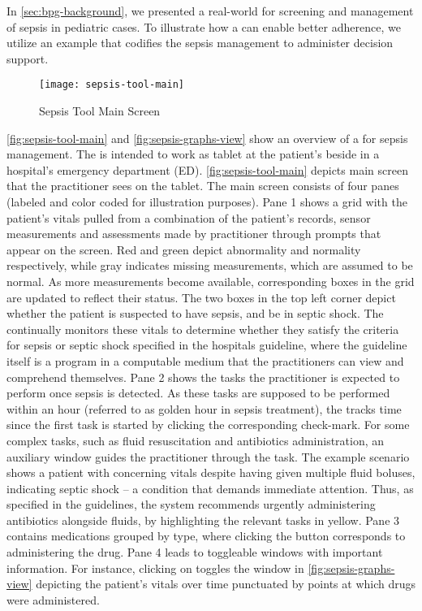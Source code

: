 In \autoref{sec:bpg-background}, we presented a real-world
\BPG{} for screening and management of sepsis in pediatric cases.
To illustrate how a \CDSSs{} can enable better \BPG{} adherence,
we utilize an example \CDSS{} that codifies the sepsis management \BPG{}
to administer decision support.

\begin{figure}[t!]
  \centering
  \texttt{[image: sepsis-tool-main]}
  \caption{Sepsis Tool Main Screen}\label{fig:sepsis-tool-main}
\end{figure}

\autoref{fig:sepsis-tool-main} and \autoref{fig:sepsis-graphs-view} show an overview
of a \CDSS{} for sepsis management.
The \CDSS{} is intended to work as tablet at
the patient's beside in a hospital's emergency department (ED).
\autoref{fig:sepsis-tool-main} depicts main screen that the practitioner sees on the tablet.
The main screen consists of four panes (labeled and color coded for illustration
purposes). Pane 1 shows a grid with the patient's vitals pulled
from a combination of the patient's records, sensor measurements and
assessments made by practitioner through prompts that appear on the screen.
Red and green depict abnormality and normality respectively, while gray
indicates missing measurements, which are assumed to be normal. As more
measurements become available, corresponding boxes in the grid are updated
to reflect their status. The two boxes in the top left corner depict whether
the patient is suspected to have sepsis, and be in septic shock. The \CDSS{}
continually monitors these vitals to determine whether they satisfy the criteria
for sepsis or septic shock specified in the hospitals guideline, where the
guideline itself is a program in a computable medium that the practitioners
can view and comprehend themselves. Pane 2 shows the tasks the practitioner is expected to perform
once sepsis is detected. As these tasks are supposed to be performed within an
hour (referred to as golden hour in sepsis treatment), the \CDSS{} tracks time
since the first task is started by clicking the corresponding check-mark.
For some complex tasks, such as fluid resuscitation and antibiotics
administration, an auxiliary window guides the practitioner through the task. The
example scenario shows a patient with concerning vitals despite having
given multiple fluid boluses, indicating septic shock -- a condition that
demands immediate attention. Thus, as specified in the guidelines, the system
recommends urgently administering antibiotics alongside fluids, by highlighting
the relevant tasks in yellow.
Pane 3 contains medications grouped by type, where clicking the
 button corresponds to administering the drug.
Pane 4 leads to toggleable windows with
important information. For instance, clicking on 
toggles the window in \autoref{fig:sepsis-graphs-view} depicting
the patient's vitals over time punctuated by points at which
drugs were administered.


